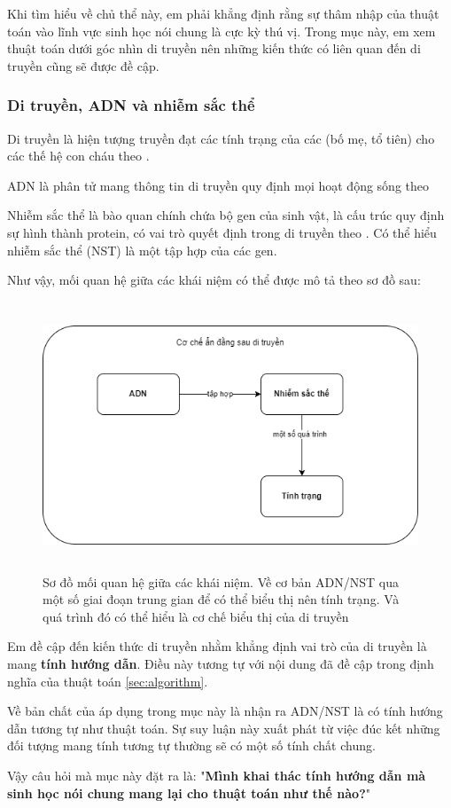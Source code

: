 Khi tìm hiểu về chủ thể này, em phải khẳng định rằng sự thâm nhập của thuật toán vào lĩnh vực sinh học nói chung là cực kỳ thú vị. Trong mục này, em xem thuật toán dưới góc nhìn di truyền nên những kiến thức có liên quan đến di truyền cũng sẽ được đề cập.

\subsubsection{Di truyền, ADN và nhiễm sắc thể}
Di truyền là hiện tượng truyền đạt các tính trạng của các (bố mẹ, tổ tiên) cho các thế hệ con cháu theo \cite{whatIsGenetic}.

ADN là phân tử mang thông tin di truyền quy định mọi hoạt động sống theo \cite{whatIsDNA}

Nhiễm sắc thể là bào quan chính chứa bộ gen của sinh vật, là cấu trúc quy định sự hình thành protein, có vai trò quyết định trong di truyền theo \cite{whatIsChronosome}. Có thể hiểu nhiễm sắc thể (NST) là một tập hợp của các gen.

Như vậy, mối quan hệ giữa các khái niệm có thể được mô tả theo sơ đồ sau:
\begin{figure}[h]
	\centering
	\includegraphics[scale=0.5, height=8cm]{figures/genetic_illustration_diagram.png}
	\caption{Sơ đồ mối quan hệ giữa các khái niệm. Về cơ bản ADN/NST qua một số giai đoạn trung gian để có thể biểu thị nên tính trạng. Và quá trình đó có thể hiểu là cơ chế biểu thị của di truyền}
	\label{fig:genetic_illustration_diagram}
\end{figure}

\noindent
Em đề cập đến kiến thức di truyền nhằm khẳng định vai trò của di truyền là mang \textbf{tính hướng dẫn}. Điều này tương tự với nội dung đã đề cập trong định nghĩa của thuật toán \ref{sec:algorithm}.

Về bản chất của áp dụng trong mục này là nhận ra ADN/NST là có tính hướng dẫn tương tự như thuật toán. Sự suy luận này xuất phát từ việc đúc kết những đối tượng mang tính tương tự thường sẽ có một số tính chất chung.

Vậy câu hỏi mà mục này đặt ra là: "\textbf{Mình khai thác tính hướng dẫn mà sinh học nói chung mang lại cho thuật toán như thế nào?}"

